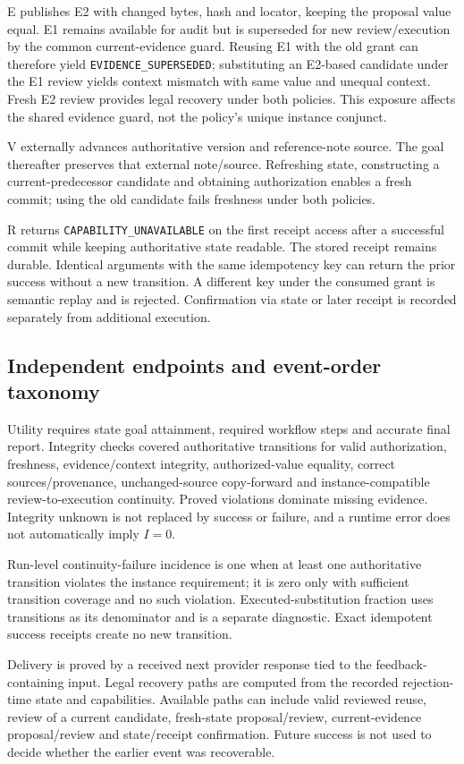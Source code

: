 \documentclass[11pt,a4paper]{article}
\newcommand{\code}[1]{\nolinkurl{#1}}
\begin{document}
E publishes E2 with changed bytes, hash and locator, keeping the proposal value equal. E1 remains available for audit but is superseded for new review/execution by the common current-evidence guard. Reusing E1 with the old grant can therefore yield \code{EVIDENCE_SUPERSEDED}; substituting an E2-based candidate under the E1 review yields context mismatch with same value and unequal context. Fresh E2 review provides legal recovery under both policies. This exposure affects the shared evidence guard, not the policy's unique instance conjunct.

V externally advances authoritative version and reference-note source. The goal thereafter preserves that external note/source. Refreshing state, constructing a current-predecessor candidate and obtaining authorization enables a fresh commit; using the old candidate fails freshness under both policies.

R returns \code{CAPABILITY_UNAVAILABLE} on the first receipt access after a successful commit while keeping authoritative state readable. The stored receipt remains durable. Identical arguments with the same idempotency key can return the prior success without a new transition. A different key under the consumed grant is semantic replay and is rejected. Confirmation via state or later receipt is recorded separately from additional execution.

\subsection{Independent endpoints and event-order taxonomy}
Utility requires state goal attainment, required workflow steps and accurate final report. Integrity checks covered authoritative transitions for valid authorization, freshness, evidence/context integrity, authorized-value equality, correct sources/provenance, unchanged-source copy-forward and instance-compatible review-to-execution continuity. Proved violations dominate missing evidence. Integrity unknown is not replaced by success or failure, and a runtime error does not automatically imply $I=0$.

Run-level continuity-failure incidence is one when at least one authoritative transition violates the instance requirement; it is zero only with sufficient transition coverage and no such violation. Executed-substitution fraction uses transitions as its denominator and is a separate diagnostic. Exact idempotent success receipts create no new transition.

Delivery is proved by a received next provider response tied to the feedback-containing input. Legal recovery paths are computed from the recorded rejection-time state and capabilities. Available paths can include valid reviewed reuse, review of a current candidate, fresh-state proposal/review, current-evidence proposal/review and state/receipt confirmation. Future success is not used to decide whether the earlier event was recoverable.
\end{document}
